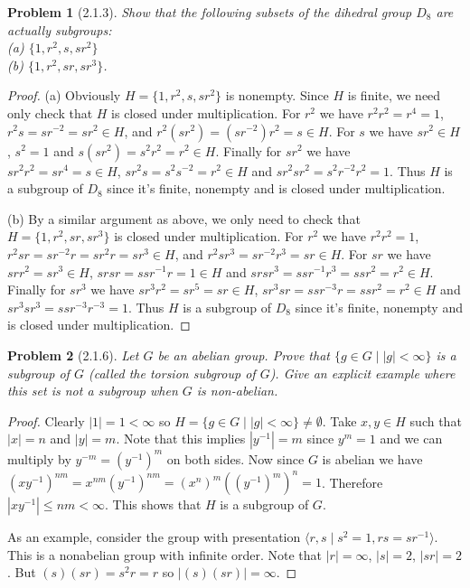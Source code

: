\documentclass{article}
\newtheorem{problem}{Problem}
\begin{document}

\begin{problem}[2.1.3]
\label{d8subgroups}
Show that the following subsets of the dihedral group $D_8$ are actually subgroups:\\
(a) $\{1, r^2, s, sr^2\}$\\
(b) $\{1, r^2, sr, sr^3\}$.
\end{problem}
\begin{proof}
(a) Obviously $H = \{1, r^2, s, sr^2\}$ is nonempty. Since $H$ is finite, we need only check that $H$ is closed under multiplication. For $r^2$ we have $r^2 r^2 = r^4 = 1$, $r^2 s = sr^{-2} = sr^2 \in H$, and $r^2(sr^2) = (sr^{-2})r^2 = s \in H$. For $s$ we have $sr^2 \in H$, $s^2 = 1$ and $s(sr^2) = s^2r^2 = r^2 \in H$. Finally for $sr^2$ we have $sr^2 r^2 = sr^4 = s \in H$, $sr^2s = s^2s^{-2} = r^2 \in H$ and $sr^2sr^2 = s^2r^{-2}r^2 = 1$. Thus $H$ is a subgroup of $D_8$ since it's finite, nonempty and is closed under multiplication.

(b) By a similar argument as above, we only need to check that $H = \{1, r^2, sr, sr^3\}$ is closed under multiplication. For $r^2$ we have $r^2r^2 = 1$, $r^2sr = sr^{-2}r = sr^2r = sr^3 \in H$, and $r^2sr^3 = sr^{-2}r^3 = sr \in H$. For $sr$ we have $srr^2 = sr^3 \in H$, $srsr = ssr^{-1}r = 1 \in H$ and $srsr^3 = ssr^{-1}r^3 = ssr^2 = r^2 \in H$. Finally for $sr^3$ we have $sr^3r^2 = sr^5 = sr \in H$, $sr^3sr = ssr^{-3}r = ssr^2 = r^2 \in H$ and $sr^3sr^3 = ssr^{-3}r^{-3} = 1$. Thus $H$ is a subgroup of $D_8$ since it's finite, nonempty and is closed under multiplication.
\end{proof}

\begin{problem}[2.1.6]
Let $G$ be an abelian group. Prove that $\{g \in G \mid |g| < \infty\}$ is a subgroup of $G$ (called the \emph{torsion subgroup} of $G$). Give an explicit example where this set is not a subgroup when $G$ is non-abelian.
\end{problem}
\begin{proof}
Clearly $|1| = 1 < \infty$ so $H = \{g \in G \mid |g| < \infty\} \neq \emptyset$. Take $x, y \in H$ such that $|x| = n$ and $|y| = m$. Note that this implies $|y^{-1}| = m$ since $y^m = 1$ and we can multiply by $y^{-m} = (y^{-1})^m$ on both sides. Now since $G$ is abelian we have $(xy^{-1})^{nm} = x^{nm}(y^{-1})^{nm} = (x^n)^m ((y^{-1})^m)^n = 1$. Therefore $|xy^{-1}| \leq nm < \infty$. This shows that $H$ is a subgroup of $G$.

As an example, consider the group with presentation $\langle r, s \mid s^2 = 1, rs = sr^{-1} \rangle$. This is a nonabelian group with infinite order. Note that $|r| = \infty$, $|s| = 2$, $|sr| = 2$. But $(s)(sr) = s^2r = r$ so $|(s)(sr)| = \infty$.
\end{proof}
\end{document}
